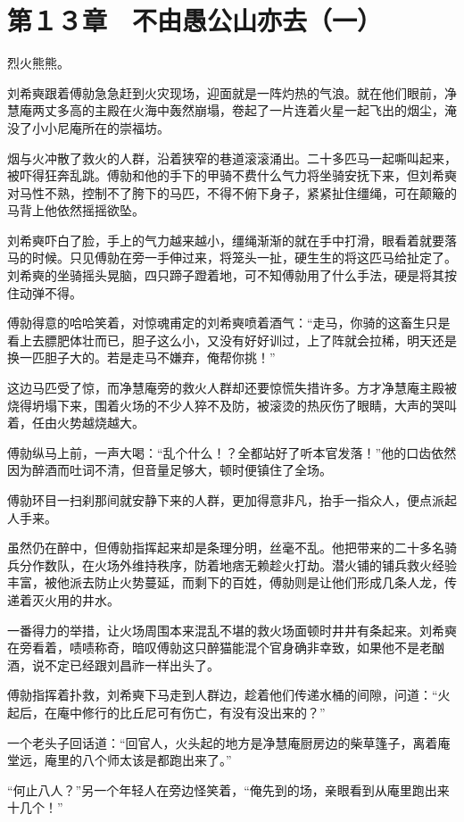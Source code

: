 \section{第１３章　不由愚公山亦去（一）}

烈火熊熊。

刘希奭跟着傅勍急急赶到火灾现场，迎面就是一阵灼热的气浪。就在他们眼前，净慧庵两丈多高的主殿在火海中轰然崩塌，卷起了一片连着火星一起飞出的烟尘，淹没了小小尼庵所在的崇福坊。

烟与火冲散了救火的人群，沿着狭窄的巷道滚滚涌出。二十多匹马一起嘶叫起来，被吓得狂奔乱跳。傅勍和他的手下的甲骑不费什么气力将坐骑安抚下来，但刘希奭对马性不熟，控制不了胯下的马匹，不得不俯下身子，紧紧扯住缰绳，可在颠簸的马背上他依然摇摇欲坠。

刘希奭吓白了脸，手上的气力越来越小，缰绳渐渐的就在手中打滑，眼看着就要落马的时候。只见傅勍在旁一手伸过来，将笼头一扯，硬生生的将这匹马给扯定了。刘希奭的坐骑摇头晃脑，四只蹄子蹬着地，可不知傅勍用了什么手法，硬是将其按住动弹不得。

傅勍得意的哈哈笑着，对惊魂甫定的刘希奭喷着酒气：“走马，你骑的这畜生只是看上去膘肥体壮而已，胆子这么小，又没有好好训过，上了阵就会拉稀，明天还是换一匹胆子大的。若是走马不嫌弃，俺帮你挑！”

这边马匹受了惊，而净慧庵旁的救火人群却还要惊慌失措许多。方才净慧庵主殿被烧得坍塌下来，围着火场的不少人猝不及防，被滚烫的热灰伤了眼睛，大声的哭叫着，任由火势越烧越大。

傅勍纵马上前，一声大喝：“乱个什么！？全都站好了听本官发落！”他的口齿依然因为醉酒而吐词不清，但音量足够大，顿时便镇住了全场。

傅勍环目一扫刹那间就安静下来的人群，更加得意非凡，抬手一指众人，便点派起人手来。

虽然仍在醉中，但傅勍指挥起来却是条理分明，丝毫不乱。他把带来的二十多名骑兵分作数队，在火场外维持秩序，防着地痞无赖趁火打劫。潜火铺的铺兵救火经验丰富，被他派去防止火势蔓延，而剩下的百姓，傅勍则是让他们形成几条人龙，传递着灭火用的井水。

一番得力的举措，让火场周围本来混乱不堪的救火场面顿时井井有条起来。刘希奭在旁看着，啧啧称奇，暗叹傅勍这只醉猫能混个官身确非幸致，如果他不是老酗酒，说不定已经跟刘昌祚一样出头了。

傅勍指挥着扑救，刘希奭下马走到人群边，趁着他们传递水桶的间隙，问道：“火起后，在庵中修行的比丘尼可有伤亡，有没有没出来的？”

一个老头子回话道：“回官人，火头起的地方是净慧庵厨房边的柴草篷子，离着庵堂远，庵里的八个师太该是都跑出来了。”

“何止八人？”另一个年轻人在旁边怪笑着，“俺先到的场，亲眼看到从庵里跑出来十几个！”

